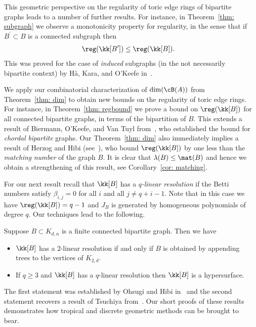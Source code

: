 This geometric perspective on the regularity of toric edge rings of bipartite graphs leads to a number of further results.  For instance, in Theorem~\ref{thm: subgraph} we observe a monotonicity property for regularity, in the sense that if $B^\prime \subset B$ is a connected subgraph then
\[\reg ({\kk}[B^\prime]) \leq \reg ({\kk}[B]).\]
\noindent
This was proved for the case of \emph{induced} subgraphs (in the not necessarily bipartite context) by H\`a, Kara, and O'Keefe in~\cite{ha2019}.

We apply our combinatorial characterization of $\dim(\cB(A))$ from Theorem~\ref{thm: dim} to obtain new bounds on the regularity of toric edge rings. For instance, in Theorem~\ref{thm: regbound} we prove a bound on $\reg({\kk}[B])$ for all connected bipartite graphs, in terms of the bipartition of $B$. This extends a result of Biermann, O'Keefe, and Van Tuyl from~\cite{BieOkeVan17}, who established the bound for \emph{chordal bipartite} graphs.
Our Theorem~\ref{thm: dim} also immediately implies a result of Herzog and Hibi (see~\cite{herzog2020regularity}), who bound $\reg({\kk}[B])$
by one less than the \emph{matching number} of the graph $B$. It is clear that $\lambda(B) \leq \mat(B)$ and hence we obtain a strengthening of this result, see Corollary~\ref{cor: matching}.

For our next result recall that ${\kk}[B]$ has a \emph{$q$-linear resolution} if the Betti numbers satisfy $\beta_{i,j} = 0$ for all $i$ and all $j \neq q + i -1$. Note that in this case we have $\reg({\kk}[B]) = q-1$ and $J_B$ is generated by homogeneous polynomials of degree $q$.  Our techniques lead to the following.

\begin{thm}\label{thm: qreg}
Suppose $B \subset K_{d,n}$ is a finite connected bipartite graph. Then we have
\begin{itemize}
     \item $\kk[B]$ has a $2$-linear resolution if and only if $B$ is obtained by appending trees to the vertices of $K_{2,d}$.   
    
    \item If $q \geq 3$ and  $\kk[B]$ has a $q$-linear resolution then $\kk[B]$ is a hypersurface.
    \end{itemize}
\end{thm}
\noindent The first statement was established by Ohsugi and Hibi in~\cite[Theorem 4.6]{ohsugihibi1999} and the second statement recovers a result of Tsuchiya from~\cite{tsuchiya2021}. Our short proofs of these results demonstrates how tropical and discrete geometric methods can be brought to bear. 

